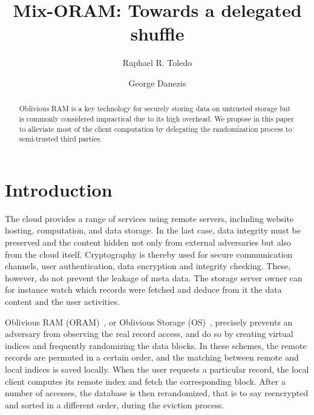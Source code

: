 \documentclass{llncs}
\begin{document}
\title{Mix-ORAM: Towards a delegated shuffle}
%
%
\author{Raphael R. Toledo \and George Danezis}
%
%
%

\maketitle              %

\begin{abstract}
Oblivious RAM is a key technology for securely storing data on untrusted storage but is commonly considered impractical due to its high overhead. We propose in this paper to  alleviate most of the client computation by delegating the randomization process to semi-trusted third parties.
\end{abstract}
%
\section{Introduction}\label{Introduction}
%
The cloud provides a range of services using remote servers, including website hosting, computation, and data storage. In the last case, data integrity must be preserved and the content hidden not only from external adversaries but also from the cloud itself.
Cryptography is thereby used for secure communication channels, user authentication, data encryption and integrity checking.
These, however, do not prevent the leakage of meta data. The storage server owner can for instance watch which records were fetched and deduce from it the data content and the user activities. 

Oblivious RAM (ORAM)~\cite{goldreich87}, or Oblivious Storage (OS)~\cite{boneh2011}, precisely prevents an adversary from observing the real record access, and do so by creating virtual indices and frequently randomizing the data blocks. In these schemes, the remote records are permuted in a certain order, and the matching between remote and local indices is saved locally. When the user requests a particular record, the local client  computes its remote index and fetch the corresponding block. After a number of accesses, the database is then rerandomized, that is to say reencrypted and sorted in a different order, during the eviction process. 
\end{document}
